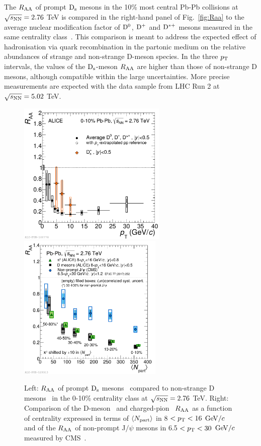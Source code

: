 The $R_{\rm AA}$ of prompt ${\rm D_s}$ mesons in the 10\% most central Pb-Pb collisions 
at $\sqrt{s_{\rm NN}} =  2.76$ TeV is compared in the right-hand panel
of Fig.~\ref{fig:Raa} to the average nuclear modification factor of 
${\rm D^0}$, ${\rm D^+}$ and ${\rm D^{*+}}$ mesons measured in the same
centrality class~\cite{Adam:2015sza}. This comparison is meant to 
address the expected effect of hadronisation via quark
recombination in the partonic medium on the relative abundances 
of strange and non-strange D-meson
species. In the three $p_{\rm T}$ intervals, the values of the ${\rm D_s}$-meson $R_{\rm AA}$ 
are higher than those of non-strange D mesons, although 
compatible within the large uncertainties. More precise measurements are 
expected with the data sample from LHC Run 2 at $\sqrt{s_{\rm NN}} = 5.02$ TeV.\\
\begin{figure}[!ht]
  \centering
    \includegraphics[width=7.1cm]{FigCap2/RAADsD_276.pdf}
    \includegraphics[width=6.9cm]{FigCap2/2017-May-22-RaavsNpart_Dmes8to16_Pions8to16_FinalNonPromptJpsi2017_CC_25042017.pdf}
  \caption{Left: $R_{\rm AA}$ of prompt ${\rm D_s}$ mesons~\cite{Adam:2015jda} compared to non-strange D mesons~\cite{Adam:2015sza} in the 0-10\% centrality class at $\sqrt{s_{\rm NN}} = 2.76$ TeV. Right: Comparison of the D-meson~\cite{Adam:2015nna} and charged-pion~\cite{Abelev:2014laa} $R_{\rm AA}$ as a function of centrality expressed in terms of $\langle N_{\rm part} \rangle $ in 8 $< p_{\rm T} < 16$ $\mathrm{GeV}/c$~\cite{Adam:2015nna} 
and of the $R_{\rm AA}$ of non-prompt J$/\psi$ mesons in 6.5 $< p_{\rm T} < 30$ $\mathrm{GeV}/c$ measured by CMS~\cite{Khachatryan:2016ypw}. 
}
  \label{fig:ColorMassDep}
\end{figure}

